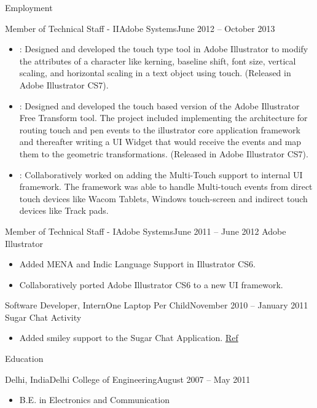 \documentclass[]{mukeshcv}
\begin{document}
\begin{cvsection}{Employment}
\begin{cvsubsection}{Member of Technical Staff - II}{Adobe Systems}{June 2012 -- October 2013}
			\begin{itemize}
				\item {}: Designed and developed the touch type tool in Adobe Illustrator to modify the attributes of a character like kerning, baseline shift, font size, vertical scaling, and horizontal scaling in a text object using touch. (Released in Adobe Illustrator CS7).
				\item {}: Designed and developed the touch based version of the Adobe Illustrator Free Transform tool. The project included implementing the architecture for routing touch and pen events to the illustrator core application framework and thereafter writing a UI Widget that would receive the events and map them to the geometric transformations. (Released in Adobe Illustrator CS7).
				\item {}: Collaboratively worked on adding the Multi-Touch support to internal UI framework. The framework was able to handle Multi-touch events from direct touch devices like Wacom Tablets, Windows touch-screen and indirect touch devices like Track pads.\\
			\end{itemize}
		\end{cvsubsection}
		\begin{cvsubsection}{Member of Technical Staff - I}{Adobe Systems}{June 2011 -- June 2012}
			Adobe Illustrator		
			\begin{itemize}
				\item Added MENA and Indic Language Support in Illustrator CS6.
				\item Collaboratively ported Adobe Illustrator CS6 to a new UI framework.
			\end{itemize}
		\end{cvsubsection}
		
		\begin{cvsubsection}{Software Developer, Intern}{One Laptop Per Child}{November 2010 -- January 2011}
			Sugar Chat Activity	
			\begin{itemize}
				\item Added smiley support to the Sugar Chat Application. \href{http://lists.sugarlabs.org/archive/sugar-devel/2010-December/029329.html}{Ref}
			\end{itemize}
		\end{cvsubsection}
	\end{cvsection}
	
	\begin{cvsection}{Education}
		\begin{cvsubsection}{Delhi, India}{Delhi College of Engineering}{August 2007 -- May 2011}
			\begin{itemize}
				\item B.E. in Electronics and Communication
			\end{itemize}
		\end{cvsubsection}
	\end{cvsection}
	

	
\end{document}
